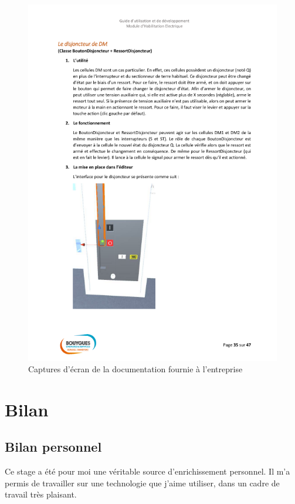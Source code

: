 \documentclass[a4paper]{article}
\begin{document}
\begin{figure}[H]
        \includegraphics[scale=0.35]{img/DocTechnique2}
        \caption{Captures d'écran de la documentation fournie à l'entreprise}
    \end{figure}

    \section{Bilan}

    \vspace{10pt}
    
    \subsection{Bilan personnel}

        Ce stage a été pour moi une véritable source d'enrichissement personnel. Il m'a permis de travailler sur une technologie que j'aime utiliser, dans un cadre de travail très plaisant. \\
\end{document}
